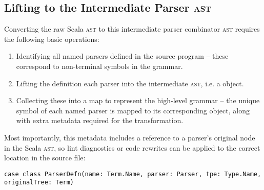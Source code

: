 \documentclass[../../main.tex]{subfiles}
\begin{document}
\subsection{Lifting to the Intermediate Parser \textsc{ast}}\label{sec:lifting-parsers}
Converting the raw Scala \textsc{ast} to this intermediate parser combinator \textsc{ast} requires the following basic operations:
\begin{enumerate}
  \item Identifying all named parsers defined in the source program -- these correspond to non-terminal symbols in the grammar.
  \item Lifting the definition each parser into the intermediate \textsc{ast}, i.e. a  object.
  \item Collecting these into a map to represent the high-level grammar -- the unique symbol of each named parser is mapped to its corresponding  object, along with extra metadata required for the transformation.
\end{enumerate}
%
Most importantly, this metadata includes a reference to a parser's original node in the Scala \textsc{ast}, so lint diagnostics or code rewrites can be applied to the correct location in the source file:
\begin{verbatim}
case class ParserDefn(name: Term.Name, parser: Parser, tpe: Type.Name, originalTree: Term)
\end{verbatim}
\end{document}
